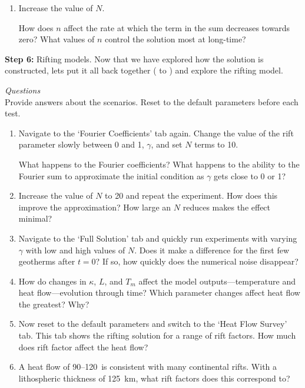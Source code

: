 \documentclass[11pt,a4paper,final]{article}
\begin{document}
\begin{enumerate}
\begin{enumerate}
        \item Increase the value of $N$.

        How does $n$ affect the rate at which the term in the sum decreases towards zero?  What values of $n$ control the solution most at long-time?

    \end{enumerate}

    \vspace{1em}
    {\bf Step 6:} Rifting models.
    Now that we have explored how the solution is constructed, lets put it all back
    together ( to ) and explore the rifting model.
    
    \noindent \emph{Questions} \\
    Provide answers about the scenarios. Reset to the default parameters before each test.
    \begin{enumerate}
        \item Navigate to the `Fourier Coefficients' tab again.  Change the value of the rift parameter slowly between 0 and 1, $\gamma$, and set $N$ terms to 10.

        What happens to the Fourier coefficients?  What happens to the ability to the Fourier sum to approximate the initial condition as $\gamma$ gets close to 0 or 1?

        \item Increase the value of $N$ to 20 and repeat the experiment.  How does this improve the approximation? How large an $N$ reduces makes the effect minimal?

        \item Navigate to the `Full Solution' tab and quickly run experiments with varying $\gamma$ with low and high values of $N$.  Does it make a difference for the first few geotherms after $t=0$?  If so, how quickly does the numerical noise disappear?

        \item How do changes in $\kappa$, $L$, and $T_m$ affect the model outputs---temperature and heat flow---evolution through time? Which parameter changes affect heat flow the greatest?  Why?

        \item Now reset to the default parameters and switch to the `Heat Flow Survey' tab. This tab shows the rifting solution for a range of rift factors.  How much does rift factor affect the heat flow?

        \item A heat flow of 90--120~\hfu is consistent with many continental rifts.  With a lithospheric thickness of 125~km, what rift factors does this correspond to?


\end{enumerate}
\end{enumerate}
\end{document}

